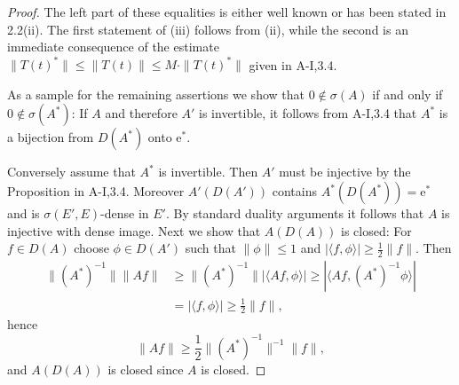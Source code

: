 \begin{proof}
The left part of these equalities is either well known or has been stated in 
2.2(ii).
The first statement of (iii) follows from (ii), while the second is an immediate consequence of the estimate $\|T(t)^*\| \leq \|T(t)\| \leq M\cdot\|T(t)^*\|$ given in A-I,3.4.

As a sample for the remaining assertions we show that $0 \notin \sigma(A)$ if and only if $0 \notin \sigma(A^*)$:
If $A$ and therefore $A'$ is invertible, it follows from A-I,3.4 that $A^*$ is a bijection from $D(A^*)$ onto $\mathrm{e}^*$.

Conversely assume that $A^*$ is invertible.
Then $A'$ must be injective by the Proposition in A-I,3.4.
Moreover $A'(D(A'))$ contains $A^*(D(A^*)) = \mathrm{e}^*$ and is $\sigma(E',E)$-dense in $E'$.
By standard duality arguments it follows that $A$ is injective with dense image.
Next we show that $A(D(A))$ is closed: For $f \in D(A)$ choose $\phi \in D(A')$ such that $\|\phi\| \leq 1$ and $|\langle f,\phi \rangle| \geq \frac{1}{2}\|f\|$.
Then
\begin{align*}
\|(A^*)^{-1}\| \|Af\| &\geq \|(A^*)^{-1}\| |\langle Af,\phi \rangle| \geq |\langle Af,(A^*)^{-1}\phi \rangle| \\
&= |\langle f,\phi \rangle| \geq \frac{1}{2}\|f\| ,
\end{align*}
hence
\[
\|Af\| \geq \frac{1}{2}\|(A^*)^{-1}\|^{-1}\|f\| ,
\]
and $A(D(A))$ is closed since $A$ is closed.
\end{proof}
